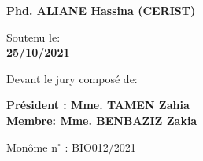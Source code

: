 \documentclass[a4paper, 12pt]{book}
\begin{document}
\begin{center}
{\large{\textbf{Phd. ALIANE Hassina (CERIST)} }}
\end{center}

\begin{center}
\setlength{\parskip}{3ex plus 0.5ex minus 0.2ex}

Soutenu le: \\
{\large \bf{25/10/2021}}
\end{center}
\begin{center}
\setlength{\parskip}{4ex plus 0.5ex minus 0.2ex}
Devant le jury composé de:
\end{center}

\begin{center}  
\textbf{{\large{Président : Mme. TAMEN Zahia}}}\\
\textbf{{\large{Membre: Mme. BENBAZIZ Zakia }}}
\end{center}

\begin{center}  
\setlength{\parskip}{6ex plus 0.5ex minus 0.2ex}
Monôme n$^{\circ}$ : BIO012/2021 
\end{center}
\end{document}
